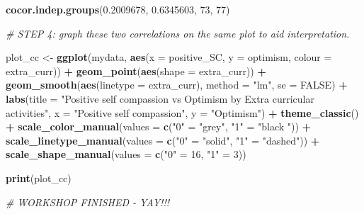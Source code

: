 \documentclass[
]{book}
\newenvironment{Shaded}{\begin{snugshade}}{\end{snugshade}}
\newcommand{\AttributeTok}[1]{\textcolor[rgb]{0.13,0.29,0.53}{#1}}
\newcommand{\CommentTok}[1]{\textcolor[rgb]{0.56,0.35,0.01}{\textit{#1}}}
\newcommand{\ConstantTok}[1]{\textcolor[rgb]{0.56,0.35,0.01}{#1}}
\newcommand{\DecValTok}[1]{\textcolor[rgb]{0.00,0.00,0.81}{#1}}
\newcommand{\FloatTok}[1]{\textcolor[rgb]{0.00,0.00,0.81}{#1}}
\newcommand{\FunctionTok}[1]{\textcolor[rgb]{0.13,0.29,0.53}{\textbf{#1}}}
\newcommand{\NormalTok}[1]{#1}
\newcommand{\OtherTok}[1]{\textcolor[rgb]{0.56,0.35,0.01}{#1}}
\newcommand{\SpecialCharTok}[1]{\textcolor[rgb]{0.81,0.36,0.00}{\textbf{#1}}}
\newcommand{\StringTok}[1]{\textcolor[rgb]{0.31,0.60,0.02}{#1}}
\begin{document}
\begin{Shaded}
\begin{Highlighting}[]
\FunctionTok{cocor.indep.groups}\NormalTok{(}\FloatTok{0.2009678}\NormalTok{, }\FloatTok{0.6345603}\NormalTok{, }\DecValTok{73}\NormalTok{, }\DecValTok{77}\NormalTok{)}

\CommentTok{\# STEP 4: graph these two correlations on the same plot to aid interpretation.}

\NormalTok{plot\_cc }\OtherTok{\textless{}{-}} \FunctionTok{ggplot}\NormalTok{(mydata, }\FunctionTok{aes}\NormalTok{(}\AttributeTok{x =}\NormalTok{ positive\_SC, }\AttributeTok{y =}\NormalTok{ optimism, }\AttributeTok{colour =}\NormalTok{ extra\_curr)) }\SpecialCharTok{+}
  \FunctionTok{geom\_point}\NormalTok{(}\FunctionTok{aes}\NormalTok{(}\AttributeTok{shape =}\NormalTok{ extra\_curr)) }\SpecialCharTok{+}
  \FunctionTok{geom\_smooth}\NormalTok{(}\FunctionTok{aes}\NormalTok{(}\AttributeTok{linetype =}\NormalTok{ extra\_curr), }\AttributeTok{method =} \StringTok{"lm"}\NormalTok{, }\AttributeTok{se =} \ConstantTok{FALSE}\NormalTok{) }\SpecialCharTok{+}
  \FunctionTok{labs}\NormalTok{(}\AttributeTok{title =} \StringTok{"Positive self compassion vs Optimism by Extra curricular activities"}\NormalTok{,}
       \AttributeTok{x =} \StringTok{"Positive self compassion"}\NormalTok{,}
       \AttributeTok{y =} \StringTok{"Optimism"}\NormalTok{) }\SpecialCharTok{+}
  \FunctionTok{theme\_classic}\NormalTok{() }\SpecialCharTok{+}
  \FunctionTok{scale\_color\_manual}\NormalTok{(}\AttributeTok{values =} \FunctionTok{c}\NormalTok{(}\StringTok{"0"} \OtherTok{=} \StringTok{"grey"}\NormalTok{, }\StringTok{"1"} \OtherTok{=} \StringTok{"black "}\NormalTok{)) }\SpecialCharTok{+}
  \FunctionTok{scale\_linetype\_manual}\NormalTok{(}\AttributeTok{values =} \FunctionTok{c}\NormalTok{(}\StringTok{"0"} \OtherTok{=} \StringTok{"solid"}\NormalTok{, }\StringTok{"1"} \OtherTok{=} \StringTok{"dashed"}\NormalTok{)) }\SpecialCharTok{+}
  \FunctionTok{scale\_shape\_manual}\NormalTok{(}\AttributeTok{values =} \FunctionTok{c}\NormalTok{(}\StringTok{"0"} \OtherTok{=} \DecValTok{16}\NormalTok{, }\StringTok{"1"} \OtherTok{=} \DecValTok{3}\NormalTok{))}

\FunctionTok{print}\NormalTok{(plot\_cc)}
\end{Highlighting}
\end{Shaded}

\begin{Shaded}
\begin{Highlighting}[]
\CommentTok{\# WORKSHOP FINISHED {-} YAY!!!}
\end{Highlighting}
\end{Shaded}
\end{document}
